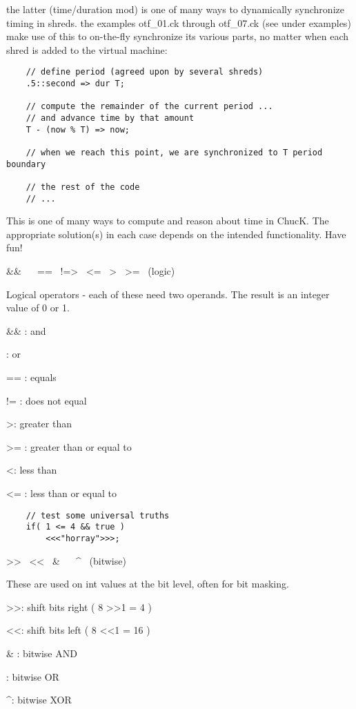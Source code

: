the latter (time/duration mod) is one of many ways to dynamically synchronize timing in shreds. the examples otf\_01.ck through otf\_07.ck (see under examples) make use of this to on-the-fly synchronize its various parts, no matter when each shred is added to the virtual machine:
\begin{verbatim}
    // define period (agreed upon by several shreds)
    .5::second => dur T;

    // compute the remainder of the current period ...
    // and advance time by that amount
    T - (now % T) => now;

    // when we reach this point, we are synchronized to T period boundary
    
    // the rest of the code
    // ...
\end{verbatim}

This is one of many ways to compute and reason about time in ChucK. The appropriate solution(s) in each case depends on the intended functionality. Have fun!
 

\&\&~ \textbar\textbar~ ==~ !=\textgreater~ \textless=~ \textgreater~ \textgreater=~ (logic)

Logical operators - each of these need two operands.  The result is an integer value of 0 or 1.
\begin{chuckitemize}
\item \&\& : and
\item \textbar\textbar : or
\item == : equals
\item != : does not equal
\item \textgreater : greater than
\item \textgreater= : greater than or equal to
\item \textless : less than
\item \textless= : less than or equal to
\end{chuckitemize}
\begin{verbatim}
    // test some universal truths
    if( 1 <= 4 && true )
        <<<"horray">>>;
\end{verbatim}
 

\textgreater\textgreater~ \textless\textless~ \&~ \textbar~ \textasciicircum~ (bitwise)

These are used on int values at the bit level, often for bit masking.
\begin{chuckitemize}
\item \textgreater\textgreater : shift bits right ( 8 \textgreater\textgreater 1 = 4 )
\item \textless\textless : shift bits left ( 8 \textless\textless 1 = 16 )
\item \& : bitwise AND
\item \textbar : bitwise OR
\item \textasciicircum : bitwise XOR
\end{chuckitemize}


